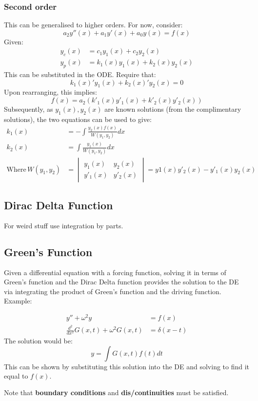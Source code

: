 \documentclass[12pt]{article}
\begin{document}
\subsubsection{Second order}
This can be generalised to higher orders. For now, consider:
\[ a_2y''(x) + a_1y'(x) + a_0y(x) = f(x)\]
Given:
\begin{align*}
    y_c(x) &= c_1y_1(x) + c_2y_2(x)\\
    y_p(x) &= k_1(x) y_1(x) + k_2(x)y_2(x)
\end{align*}
This can be substituted in the ODE. Require that:
\[ k_1(x)'y_1(x)+k_2(x)'y_2(x) = 0\]
Upon rearranging, this implies:
\[ f(x) = a_2(k'_1(x)y'_1(x)+k'_2(x)y'_2(x))\]
Subsequently, as $y_1(x),y_2(x)$ are known solutions (from the complimentary solutions), the two equations can be used to give:
\begin{align*}
    k_1(x) &= -\int \frac{y_2(x) f(x)}{W(y_1,y_2)} dx\\
    k_2(x) &= \int \frac{y_1(x)}{W(y_1,y_2)}dx\\
    \text{Where}\, W(y_1,y_2) &= \begin{vmatrix}
    y_1(x)&y_2(x)\\
    y'_1(x)&y'_2(x)
    \end{vmatrix}
    = y1(x)y'_2(x) - y'_1(x)y_2(x)
\end{align*}

\subsection{Dirac Delta Function}
For weird stuff use integration by parts.

\subsection{Green's Function}
Given a differential equation with a forcing function, solving it in terms of Green's function and the Dirac Delta function provides the solution to the DE via integrating the product of Green's function and the driving function. Example:

\begin{align*}
    y''+\omega^2 y &= f(x) \\
    \frac{d^2}{dx^2}G(x,t) + \omega^2 G(x,t) &= \delta(x-t) 
\end{align*}
The solution would be:
\[y = \int G(x,t) f(t) dt\]
This can be shown by substituting this solution into the DE and solving to find it equal to $f(x)$. 

Note that \textbf{boundary conditions} and \textbf{dis/continuities} must be satisfied.
\end{document}
